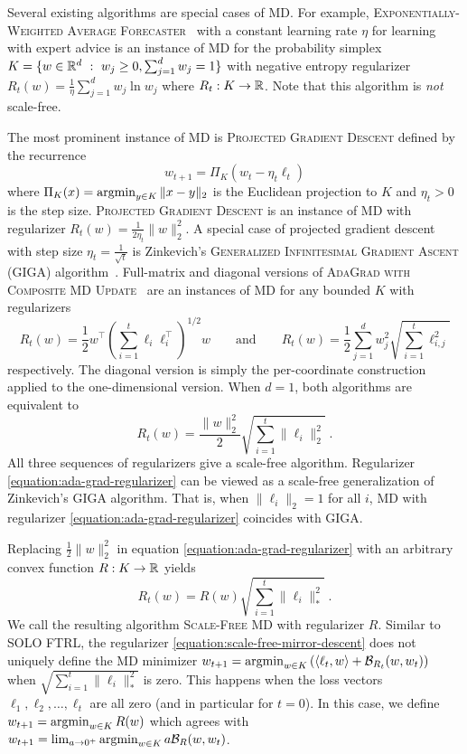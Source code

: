 Several existing algorithms are special cases of \textsc{MD}.
For example, \textsc{Exponentially-Weighted Average
Forecaster}~\cite[Chapter~2]{Cesa-Bianchi-Lugosi-2006} with a constant learning
rate $\eta$ for learning with expert advice is an instance of
\textsc{MD} for the probability simplex $K = \{ w \in \mathbb{R}^d ~:~ w_j
\ge 0, \sum_{j=1}^d w_j = 1 \}$ with negative entropy regularizer $R_t(w) =
\frac{1}{\eta} \sum_{j=1}^d w_j \ln w_j$ where $R_t:K \to \mathbb{R}$. Note that this
algorithm is \emph{not} scale-free.

The most prominent instance of \textsc{MD} is \textsc{Projected Gradient
Descent} defined by the recurrence
$$
w_{t+1} = \Pi_K(w_t - \eta_t \ell_t)
$$
where $\Pi_K(x) = \operatorname*{argmin}_{y \in K} \|x-y\|_2$ is the Euclidean projection to
$K$ and $\eta_t > 0$ is the step size.  \textsc{Projected Gradient Descent} is
an instance of \textsc{MD} with regularizer $R_t(w) =
\frac{1}{2\eta_t}\|w\|_2^2$.  A special case of projected gradient descent with
step size $\eta_t = \frac{1}{\sqrt{t}}$ is Zinkevich's \textsc{Generalized
Infinitesimal Gradient Ascent} (GIGA) algorithm~\cite{Zinkevich-2003}.
Full-matrix and diagonal versions of \textsc{AdaGrad with Composite MD
Update}~\cite{Duchi-Hazan-Singer-2011} are an instances of
\textsc{MD} for any bounded $K$ with regularizers
$$
R_t(w) = \frac{1}{2} w^\top \left(\sum_{i=1}^t \ell_i \ell_i^\top \right)^{1/2} \!\!\!\! w
\qquad \text{and} \qquad
R_t(w) = \frac{1}{2} \sum_{j=1}^d w_j^2 \sqrt{ \sum_{i=1}^t \ell_{i,j}^2}
$$
respectively. The diagonal version is simply the per-coordinate construction
applied to the one-dimensional version. When $d=1$, both algorithms are
equivalent to
\begin{equation}
\label{equation:ada-grad-regularizer}
R_t(w) = \frac{\|w\|_2^2}{2} \sqrt{\sum_{i=1}^t \|\ell_i\|_2^2 } \; .
\end{equation}
All three sequences of regularizers give a scale-free algorithm. Regularizer
\eqref{equation:ada-grad-regularizer} can be viewed as a scale-free
generalization of Zinkevich's GIGA algorithm. That is, when $\|\ell_i\|_2
= 1$ for all $i$, \textsc{MD} with regularizer
\eqref{equation:ada-grad-regularizer} coincides with GIGA.

Replacing $\frac{1}{2}\|w\|_2^2$ in equation
\eqref{equation:ada-grad-regularizer} with an arbitrary convex function $R:K
\to \mathbb{R}$ yields
\begin{equation}
\label{equation:scale-free-mirror-descent}
R_t(w) = R(w) \sqrt{\sum_{i=1}^t \|\ell_i\|_*^2} \; .
\end{equation}
We call the resulting algorithm \textsc{Scale-Free MD} with
regularizer $R$. Similar to \textsc{SOLO FTRL}, the regularizer
\eqref{equation:scale-free-mirror-descent} does not uniquely define
the \textsc{MD} minimizer
$w_{t+1} = \operatorname*{argmin}_{w \in K} \left(\langle \ell_t, w \rangle + \mathcal{B}_{R_t}(w,
w_t) \right)$ when $\sqrt{\sum_{i=1}^t \|\ell_i\|_*^2}$ is zero.
This happens when the loss vectors $\ell_1, \ell_2, \dots, \ell_t$ are all
zero (and in particular for $t=0$). In this case, we define
$w_{t+1} = \operatorname*{argmin}_{w \in K} R(w)$ which agrees with
$w_{t+1} = \lim_{a \to 0^+} \operatorname*{argmin}_{w \in K} a \mathcal{B}_{R}(w, w_t)$.

